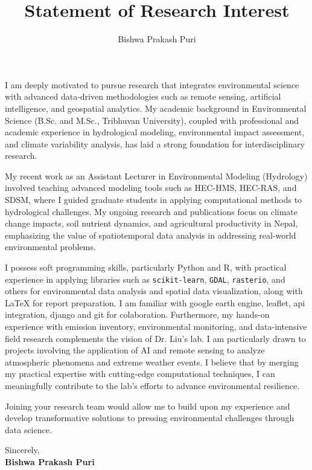 \documentclass[12pt]{article}
\title{\textbf{Statement of Research Interest}}
\author{Bishwa Prakash Puri}
\date{}
\begin{document}
\maketitle
\doublespacing

I am deeply motivated to pursue research that integrates environmental science with advanced data-driven methodologies such as remote sensing, artificial intelligence, and geospatial analytics. My academic background in Environmental Science (B.Sc. and M.Sc., Tribhuvan University), coupled with professional and academic experience in hydrological modeling, environmental impact assessment, and climate variability analysis, has laid a strong foundation for interdisciplinary research.

My recent work as an Assistant Lecturer in Environmental Modeling (Hydrology) involved teaching advanced modeling tools such as HEC-HMS, HEC-RAS, and SDSM, where I guided graduate students in applying computational methods to hydrological challenges. My ongoing research and publications focus on climate change impacts, soil nutrient dynamics, and agricultural productivity in Nepal, emphasizing the value of spatiotemporal data analysis in addressing real-world environmental problems.

I possess soft programming skills, particularly Python and R, with practical experience in applying libraries such as \texttt{scikit-learn}, \texttt{GDAL}, \texttt{rasterio}, and others for environmental data analysis and spatial data visualization, along with \LaTeX{} for report preparation. I am familiar with google earth engine, leaflet, api integration, django and git for colaboration.  Furthermore, my hands-on experience with emission inventory, environmental monitoring, and data-intensive field research complements the vision of Dr. Liu’s lab. I am particularly drawn to projects involving the application of AI and remote sensing to analyze atmospheric phenomena and extreme weather events. I believe that by merging my practical expertise with cutting-edge computational techniques, I can meaningfully contribute to the lab’s efforts to advance environmental resilience.

Joining your research team would allow me to build upon my experience and develop transformative solutions to pressing environmental challenges through data science.

\vspace{1cm}

\noindent
Sincerely, \\
\textbf{Bishwa Prakash Puri}
\end{document}
